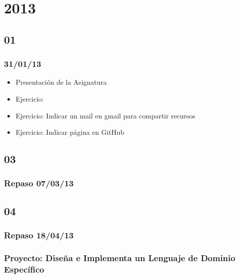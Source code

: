 \chapter{2013}

\section{01}
\subsection{31/01/13}
\begin{itemize}
\item Presentación de la Asignatura
\item Ejercicio: 
\item Ejercicio: Indicar un mail en gmail para compartir recursos
\item Ejercicio: Indicar página en GitHub
\end{itemize}

\section{03}

\subsection{Repaso 07/03/13}

\begin{enumerate}

\end{enumerate}

\section{04}

\subsection{Repaso 18/04/13}

\begin{enumerate}

\end{enumerate}

\subsection{Proyecto: Diseña e Implementa un Lenguaje de Dominio Específico}

